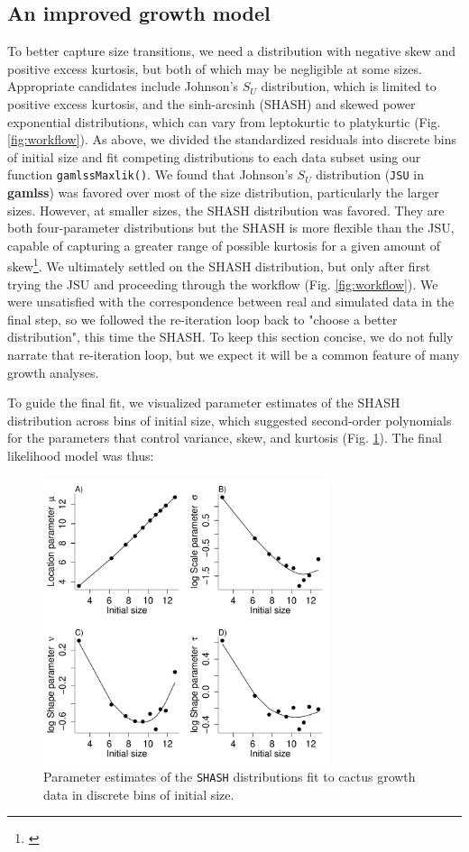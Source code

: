 \documentclass[12pt]{article}
\newcommand{\tom}[2]{{\color{red}{#1}}\footnote{\textit{\color{red}{#2}}}}
\begin{document}
\subsection{An improved growth model}
To better capture size transitions, we need a distribution with negative skew and positive excess kurtosis, but both of which may be negligible at some sizes. 
Appropriate candidates include Johnson's $S_{U}$ distribution, which is limited to positive excess kurtosis, and the sinh-arcsinh (SHASH) and skewed power exponential distributions, which can vary from leptokurtic to platykurtic (Fig. \ref{fig:workflow}). 
As above, we divided the standardized residuals into discrete bins of initial size and fit competing distributions to each data subset using our function \texttt{gamlssMaxlik()}.
We found that Johnson's $S_{U}$ distribution (\texttt{JSU} in \textbf{gamlss}) was favored over most of the size distribution, particularly the larger sizes. 
However, at smaller sizes, the SHASH distribution was favored. 
They are both four-parameter distributions but the SHASH is more flexible than the JSU, capable of capturing a greater range of possible kurtosis for a given amount of skew\tom{}{This comes from Steve's NPSkewKurtosisRanges.pdf}. 
We ultimately settled on the SHASH distribution, but only after first trying the JSU and proceeding through the workflow (Fig. \ref{fig:workflow}). 
We were unsatisfied with the correspondence between real and simulated data in the final step, so we followed the re-iteration loop back to "choose a better distribution", this time the SHASH. 
To keep this section concise, we do not fully narrate that re-iteration loop, but we expect it will be a common feature of many growth analyses. 

To guide the final fit, we visualized parameter estimates of the SHASH distribution across bins of initial size, which suggested second-order polynomials for the parameters that control variance, skew, and kurtosis (Fig. \ref{fig:cactus_binned_SHASH}). 
The final likelihood model was thus:
\begin{figure}
\centering
\includegraphics[width=0.75\textwidth]{figures/cactus_binned_SHASH}
\caption{Parameter estimates of the \texttt{SHASH} distributions fit to cactus growth data in discrete bins of initial size.}
\label{fig:cactus_binned_SHASH}
\end{figure} 
\end{document}
